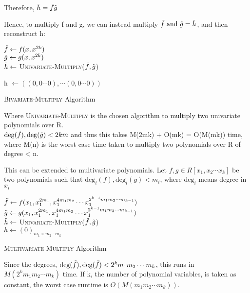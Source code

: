 Therefore, $\Tilde{h} = \Tilde{f}\Tilde{g}$

Hence, to multiply f and g, we can instead multiply $\Tilde{f} \text{ and } \Tilde{g} = \Tilde{h}$, and then reconstruct h:

\begin{algorithm}[H]
    \SetAlgoLined

        $\Tilde{f} \leftarrow f(x, x^{2k})$ \\
        $\Tilde{g} \leftarrow g(x, x^{2k})$ \\[1\baselineskip]

        $\Tilde{h} \leftarrow $ \textsc{Univariate-Multiply}($\Tilde{f}, \Tilde{g}$)

        h $\leftarrow ((0, 0 \cdots 0), \cdots (0, 0 \cdots 0)) $ 

    \caption{\textsc{Bivariate-Multiply} Algorithm}
\end{algorithm}

Where \textsc{Univariate-Multiply} is the chosen algorithm to multiply two univariate polynomials over R. \\
$\text{deg}(\Tilde{f}), \text{deg}(\Tilde{g}) < 2km$ and thus this takes M(2mk) + O(mk) = O(M(mk)) time, where M(n) is the worst case time taken to multiply two polynomials over R of degree < n. 

This can be extended to multivariate polynomials. Let $f, g \in R[x_1, x_2 \cdots x_k]$ be two polynomials such that $\text{deg}_i(f), \text{deg}_i(g) < m_i$, where $\text{deg}_i$ means degree in $x_i$

\begin{algorithm}[H]
    \SetAlgoLined
    
        $\Tilde{f} \leftarrow f(x_1, x_1^{2m_1}, x_1^{4m_1m_2} \cdots x_1^{2^{k-1}m_1m_2 \cdots m_{k-1}})$ \\  
        $\Tilde{g} \leftarrow g(x_1, x_1^{2m_1}, x_1^{4m_1m_2} \cdots x_1^{2^{k-1}m_1m_2 \cdots m_{k-1}})$ \\[1\baselineskip]

        $\Tilde{h} \leftarrow $ \textsc{Univariate-Multiply}($\Tilde{f}, \Tilde{g}$)\\[1\baselineskip]

        $h \leftarrow (0)_{m_1 \times m_2 \cdots m_k}$ \\

    \caption{\textsc{Multivariate-Multiply} Algorithm}
\end{algorithm}

Since the degrees, $\text{deg}(\Tilde{f}), \text{deg}(\Tilde{f}) < 2^k m_1 m_2 \cdots m_k$, this runs in $M(2^k m_1 m_2 \cdots m_k)$ time. If k, the number of polynomial variables, is taken as constant, the worst case runtime is $O(M(m_1 m_2 \cdots m_k))$.


